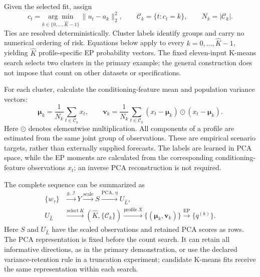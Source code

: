 \documentclass[11pt,a4paper]{article}
\begin{document}
Given the selected fit, assign
\begin{equation}
c_t=\underset{k\in\{0,\ldots,\widehat K-1\}}{\arg\min}\,
\|u_t-a_k\|_2^2,
\qquad
\mathcal C_k=\{t:c_t=k\},\qquad N_k=|\mathcal C_k|.
\end{equation}
Ties are resolved deterministically. Cluster labels identify groups and carry no numerical ordering of risk. Equations below apply to every $k=0,\ldots,\widehat K-1$, yielding $\widehat K$ profile-specific EP probability vectors. The fixed eleven-input K-means search selects two clusters in the primary example; the general construction does not impose that count on other datasets or specifications.

For each cluster, calculate the conditioning-feature mean and population variance vectors:
\begin{equation}
\boldsymbol\mu_k=\frac{1}{N_k}\sum_{t\in\mathcal C_k}x_t,
\qquad
\boldsymbol v_k=\frac{1}{N_k}\sum_{t\in\mathcal C_k}
(x_t-\boldsymbol\mu_k)\odot(x_t-\boldsymbol\mu_k).
\label{eq:profiles}
\end{equation}
Here \(\odot\) denotes elementwise multiplication. All components of a profile are estimated from the same joint group of observations. These are empirical scenario targets, rather than externally supplied forecasts. The labels are learned in PCA space, while the EP moments are calculated from the corresponding conditioning-feature observations $x_t$; an inverse PCA reconstruction is not required.

The complete sequence can be summarized as
\begin{equation}
\begin{aligned}
\{w_\tau\}
&\xrightarrow{g,\,\mathcal I}Y
\xrightarrow{\mathrm{scale}}S
\xrightarrow{\mathrm{PCA},\,\eta}U_{\widehat L},\\
U_{\widehat L}
&\xrightarrow{\mathrm{select}\ K}
(\widehat K,\{\mathcal C_k\})
\xrightarrow{\mathrm{profile}\ X}
\{(\boldsymbol\mu_k,\boldsymbol v_k)\}
\xrightarrow{\mathrm{EP}}\{q^{(k)}\}.
\end{aligned}
\label{eq:complete-pipeline}
\end{equation}
Here $S$ and $U_{\widehat L}$ have the scaled observations and retained PCA scores as rows. The PCA representation is fixed before the count search. It can retain all informative directions, as in the primary demonstration, or use the declared variance-retention rule in a truncation experiment; candidate K-means fits receive the same representation within each search.
\end{document}

